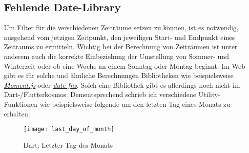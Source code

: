 \subsection{Fehlende Date-Library}

Um Filter für die verschiedenen Zeiträume setzen zu können,
ist es notwendig, ausgehend vom jetzigen Zeitpunkt,
den jeweiligen Start- und Endpunkt eines Zeitraums zu ermitteln.
Wichtig bei der Berechnung von Zeiträumen ist unter anderem auch
die korrekte Einbeziehung der Umstellung von Sommer- und Winterzeit
oder ob eine Woche an einem Sonntag oder Montag beginnt.
Im Web gibt es für solche und ähnliche Berechnungen Bibliotheken
wie beispielsweise \href{https://momentjs.com/docs/}{\textit{Moment.js}}
oder \href{https://date-fns.org/}{\textit{date-fns}}.
Solch eine Bibliothek gibt es allerdings noch nicht im Dart-/Flutterkosmos.
Dementsprechend schrieb ich verschiedene Utility-Funktionen wie
beispielsweise folgende um den letzten Tag eines Monats zu erhalten:
\begin{figure}[H]
    \centering
    \texttt{[image: last\_day\_of\_month]}
    \caption{Dart: Letzter Tag des Monats}
\end{figure}
